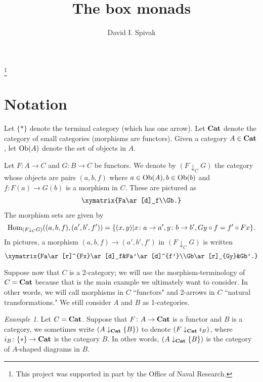 \documentclass{amsart}
\def\tn{\textnormal}
\def\Hom{\tn{Hom}}
\def\Ob{\tn{Ob}}
\def\to{\rightarrow}
\def\taking{\colon}
\def\down{\downarrow}
\def\Cat{{\bf Cat}}
\theoremstyle{remark}
\newtheorem{example}[theorem]{Example}
\theoremstyle{definition}
\begin{document}
\author{David I. Spivak}

\thanks{This project was supported in part by the Office of Naval Research.}

\title{The box monads}

\maketitle

\section{Notation}

Let $\{*\}$ denote the terminal category (which has one arrow).  Let $\Cat$ denote the category of small categories (morphisms are functors).  Given a category $A\in\Cat$, let $\Ob(A)$ denote the set of objects in $A$.

Let $F\taking A\to C$ and $G\taking B\to C$ be functors.  We denote by $(F\down_C G)$ the category whose objects are pairs $(a,b,f)$ where $a\in\Ob(A), b\in\Ob(b)$ and $f\taking F(a)\to G(b)$ is a morphism in $C$.  These are pictured as \begin{align}\label{pic:object}\xymatrix{Fa\ar[d]_f\\Gb.}\end{align}  The morphism sets are given by $$\Hom_{(F\down_C G)}((a,b,f),(a',b',f'))=\{(x,y)|x\taking a\to a', y\taking b\to b', Gy\circ f=f'\circ Fx\}.$$  In pictures, a morphism $(a,b,f)\to (a',b',f')$ in $(F\down_C G)$ is written $$\xymatrix{Fa\ar[r]^{Fx}\ar[d]_f&Fa'\ar[d]^{f'}\\Gb\ar[r]_{Gy}&Gb'.}$$

Suppose now that $C$ is a 2-category; we will use the morphism-terminology of $C=\Cat$ because that is the main example we ultimately want to consider.  In other words, we will call morphisms in $C$ ``functors" and 2-arrows in $C$ ``natural transformations."  We still consider $A$ and $B$ as 1-categories.

\begin{example}

Let $C=\Cat$.  Suppose that $F\taking A\to\Cat$ is a functor and $B$ is a category, we sometimes write $(A\down_\Cat\{B\})$ to denote $(F\down_\Cat i_B)$, where $i_B\taking\{*\}\to\Cat$ is the category $B$.  In other words, $(A\down_\Cat \{B\})$ is the category of $A$-shaped diagrams in $B$.

\end{example}
\end{document}
